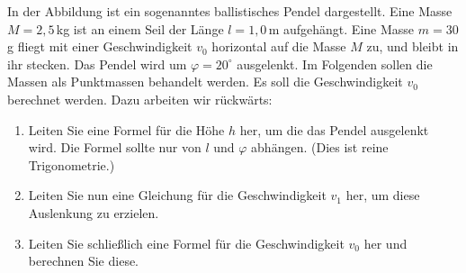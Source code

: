 \begin{ExerciseBlock}
In der Abbildung ist ein sogenanntes ballistisches Pendel dargestellt. Eine Masse $M = 2,5\,$kg ist an einem Seil der Länge $l = 1,0\,$m aufgehängt. Eine Masse $m = 30\,$g fliegt mit einer Geschwindigkeit $v_0$ horizontal auf die Masse $M$ zu, und bleibt in ihr stecken. Das Pendel wird um $\varphi = 20^\circ$ ausgelenkt. Im Folgenden sollen die Massen als Punktmassen behandelt werden. Es soll die Geschwindigkeit $v_0$ berechnet werden. Dazu arbeiten wir rückwärts:

\begin{center}
\end{center}

\begin{enumerate}
	\item Leiten Sie eine Formel für die Höhe $h$ her, um die das Pendel ausgelenkt wird. Die Formel sollte nur von $l$ und $\varphi$ abhängen. (Dies ist reine Trigonometrie.)

	\item Leiten Sie nun eine Gleichung für die Geschwindigkeit $v_1$ her, um diese Auslenkung zu
erzielen.

	\item Leiten Sie schließlich eine Formel für die Geschwindigkeit $v_0$ her und berechnen Sie diese.

\end{enumerate}
\end{ExerciseBlock}
